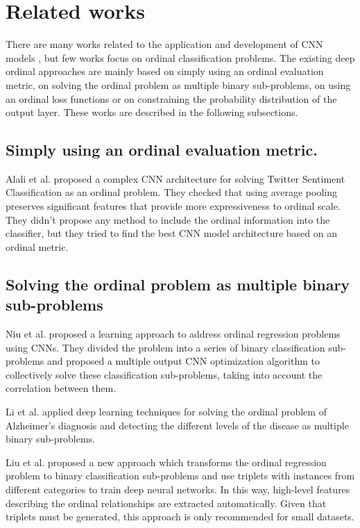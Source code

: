 \documentclass[preprint]{elsarticle}
\begin{document}
\section{Related works}
\label{sect:relatedwork}
There are many works related to the application and development of CNN models \cite{liu2017deep}, but few works focus on ordinal classification problems. The existing deep ordinal approaches are mainly based on simply using an ordinal evaluation metric, on solving the ordinal problem as multiple binary sub-problems, on using an ordinal loss functions or on constraining the probability distribution of the output layer. These works are described in the following subsections.


\subsection{Simply using an ordinal evaluation metric.}

Alali et al. \cite{alali2018multi} proposed a complex CNN architecture for solving Twitter Sentiment Classification as an ordinal problem. They checked that using average pooling preserves significant features that provide more expressiveness to ordinal scale. They didn't propose any method to include the ordinal information into the classifier, but they tried to find the best CNN model architecture based on an ordinal metric.

\subsection{Solving the ordinal problem as multiple binary sub-problems}

Niu et al. \cite{niu2016ordinal} proposed a learning approach to address ordinal regression problems using CNNs. They divided the problem into a series of binary classification sub-problems and proposed a multiple output CNN optimization algorithm to collectively solve these classification sub-problems, taking into account the correlation between them.

Li et al. \cite{li2017deep} applied deep learning techniques for solving the ordinal problem of Alzheimer's diagnosis and detecting the different levels of the disease as multiple binary sub-problems.

Liu et al. \cite{liu2017deep} proposed a new approach which transforms the ordinal regression problem to binary classification sub-problems and use triplets with instances from different categories to train deep neural networks. In this way, high-level features describing the ordinal relationships are extracted automatically. Given that triplets must be generated, this approach is only recommended for small datasets.
\end{document}
